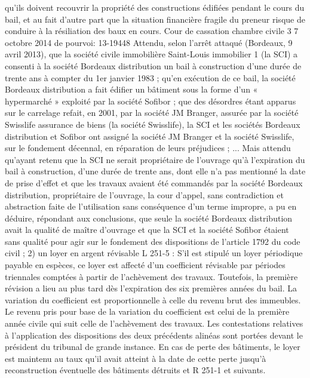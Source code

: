 \documentclass[11pt,a4paper]{report}
\begin{document}
	qu'ils doivent recouvrir la propriété des constructions édifiées pendant le cours du bail, et au fait d'autre part que
	la situation financière fragile du preneur risque de conduire à la résiliation des baux en cours.
	Cour de cassation chambre civile 3 7 octobre 2014 \No  de pourvoi: 13-19448
	Attendu, selon l'arrêt attaqué (Bordeaux, 9 avril 2013), que la société civile immobilière Saint-Louis immobilier
	1 (la SCI) a consenti à la société Bordeaux distribution un bail à construction d'une durée de trente ans à
	compter du 1er janvier 1983 ; qu'en exécution de ce bail, la société Bordeaux distribution a fait édifier un
	bâtiment sous la forme d'un « hypermarché » exploité par la société Sofibor ; que des désordres étant apparus
	sur le carrelage refait, en 2001, par la société JM Branger, assurée par la société Swisslife assurance de biens
	(la société Swisslife), la SCI et les sociétés Bordeaux distribution et Sofibor ont assigné la société JM Branger et
	la société Swisslife, sur le fondement décennal, en réparation de leurs préjudices ;
	...
	Mais attendu qu'ayant retenu que la SCI ne serait propriétaire de l'ouvrage qu'à l'expiration du bail à
	construction, d'une durée de trente ans, dont elle n'a pas mentionné la date de prise d'effet et que les travaux
	avaient été commandés par la société Bordeaux distribution, propriétaire de l'ouvrage, la cour d'appel, sans
	contradiction et abstraction faite de l'utilisation sans conséquence d'un terme impropre, a pu en déduire,
	répondant aux conclusions, que seule la société Bordeaux distribution avait la qualité de maître d'ouvrage et
	que la SCI et la société Sofibor étaient sans qualité pour agir sur le fondement des dispositions de l'article 1792
	du code civil ;
	2) un loyer en argent révisable
	L 251-5 : S'il est stipulé un loyer périodique payable en espèces, ce loyer est affecté d'un coefficient révisable
	par périodes triennales comptées à partir de l'achèvement des travaux. Toutefois, la première révision a lieu au
	plus tard dès l'expiration des six premières années du bail.
	La variation du coefficient est proportionnelle à celle du revenu brut des immeubles. Le revenu pris pour base de
	la variation du coefficient est celui de la première année civile qui suit celle de l'achèvement des travaux.
	Les contestations relatives à l'application des dispositions des deux précédents alinéas sont portées devant le
	président du tribunal de grande instance.
	En cas de perte des bâtiments, le loyer est maintenu au taux qu'il avait atteint à la date de cette perte jusqu'à
	reconstruction éventuelle des bâtiments détruits et R 251-1 et suivants.
\end{document}
